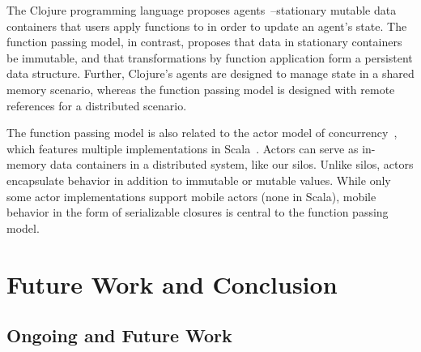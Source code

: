 \documentclass{jfp1}
\begin{document}
The Clojure programming language proposes agents~\cite{Clojure}--stationary
mutable data containers that users apply functions to in order to update an
agent's state. The function passing model, in contrast, proposes that data in
stationary containers be immutable, and that transformations by function
application form a persistent data structure. Further, Clojure's agents are
designed to manage state in a shared memory scenario, whereas the function
passing model is designed with remote references for a distributed scenario.

The function passing model is also related to the actor model of
concurrency~\cite{Actors}, which features multiple implementations in
Scala~\cite{ScalaActors,Akka,TypedActors}. Actors can serve as in-memory data
containers in a distributed system, like our silos. Unlike silos, actors
encapsulate behavior in addition to immutable or mutable values. While only some
actor implementations support mobile actors (none in Scala), mobile behavior in
the form of serializable closures is central to the function passing model.





\section{Future Work and Conclusion}
\label{sec:conclusion-future-work}

\subsection{Ongoing and Future Work}
\end{document}
